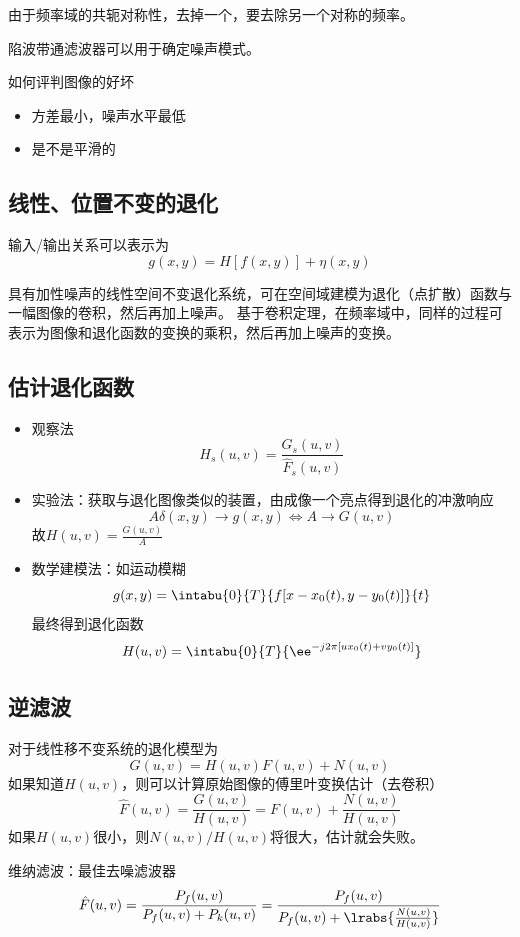 由于频率域的共轭对称性，去掉一个，要去除另一个对称的频率。

陷波带通滤波器可以用于确定噪声模式。

如何评判图像的好坏
\begin{itemize}
\item 方差最小，噪声水平最低
\item 是不是平滑的
\end{itemize}

\subsection{线性、位置不变的退化}
输入/输出关系可以表示为
\[g(x,y)=H[f(x,y)]+\eta(x,y)\]

具有加性噪声的线性空间不变退化系统，可在空间域建模为退化（点扩散）函数与一幅图像的卷积，然后再加上噪声。
基于卷积定理，在频率域中，同样的过程可表示为图像和退化函数的变换的乘积，然后再加上噪声的变换。

\subsection{估计退化函数}
\begin{itemize}
	\item 观察法
	\[H_s(u,v)=\frac{G_s(u,v)}{\hat{F}_s(u,v)}\]
	\item 实验法：获取与退化图像类似的装置，由成像一个亮点得到退化的冲激响应
	\[A\delta(x,y)\to g(x,y)\iff A\to G(u,v)\]
	故$H(u,v)=\frac{G(u,v)}{A}$
	\item 数学建模法：如运动模糊
	\[g(x,y)=\intabu{0}{T}{f[x-x_0(t),y-y_0(t)]}{t}\]
	最终得到退化函数
	\[H(u,v)=\intabu{0}{T}{\ee^{-j2\pi[ux_0(t)+vy_0(t)]}}\]
\end{itemize}

\subsection{逆滤波}
对于线性移不变系统的退化模型为
\[G(u,v)=H(u,v)F(u,v)+N(u,v)\]
如果知道$H(u,v)$，则可以计算原始图像的傅里叶变换估计（去卷积）
\[\hat{F}(u,v)=\frac{G(u,v)}{H(u,v)}=F(u,v)+\frac{N(u,v)}{H(u,v)}\]
如果$H(u,v)$很小，则$N(u,v)/H(u,v)$将很大，估计就会失败。

维纳滤波：最佳去噪滤波器
\[\hat{F}(u,v)=\frac{P_f(u,v)}{P_f(u,v)+P_k(u,v)}=\frac{P_f(u,v)}{P_f(u,v)+\lrabs{\frac{N(u,v)}{H(u,v)}}}\]